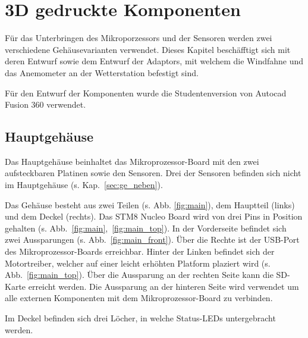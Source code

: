 \section{3D gedruckte Komponenten}\label{sec:gehaeuse}
Für das Unterbringen des Mikroporzessors und der Sensoren werden zwei verschiedene Gehäusevarianten verwendet. Dieses Kapitel beschäfftigt sich mit deren Entwurf sowie dem Entwurf der Adaptors, mit welchem die Windfahne und das Anemometer an der Wetterstation befestigt sind.

Für den Entwurf der Komponenten wurde die Studentenversion von Autocad Fusion 360 verwendet.

\subsection{Hauptgehäuse}\label{sec:ge_haupt}
Das Hauptgehäuse beinhaltet das Mikroprozessor-Board mit den zwei aufsteckbaren Platinen sowie den Sensoren. Drei der Sensoren befinden sich nicht im Hauptgehäuse (s. Kap.~\ref{sec:ge_neben}).

Das Gehäuse besteht aus zwei Teilen (s. Abb. \ref{fig:main}), dem Hauptteil (links) und dem Deckel (rechts). Das STM8 Nucleo Board wird von drei Pins in Position gehalten (s. Abb.~\ref{fig:main},~\ref{fig:main_top}). In der Vorderseite befindet sich zwei Aussparungen (s. Abb.~\ref{fig:main_front}). Über die Rechte ist der USB-Port des Mikroprozessor-Boards erreichbar. Hinter der Linken befindet sich der Motortreiber, welcher auf einer leicht erhöhten Platform plaziert wird (s. Abb.~\ref{fig:main_top}). Über die Aussparung an der rechten Seite kann die SD-Karte erreicht werden. Die Aussparung an der hinteren Seite wird verwendet um alle externen Komponenten mit dem Mikroprozessor-Board zu verbinden.

Im Deckel befinden sich drei Löcher, in welche Status-LEDs untergebracht werden.

